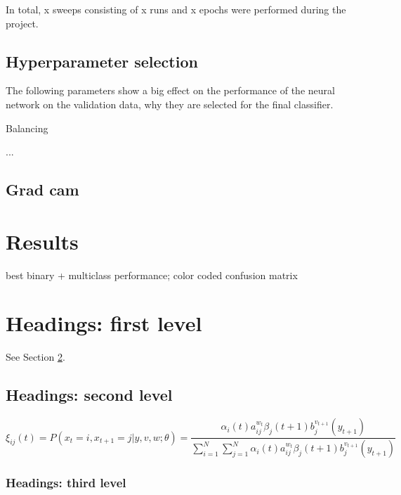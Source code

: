\documentclass{article}
\begin{document}
In total, x sweeps consisting of x runs and x epochs were performed during the project.

\subsection{Hyperparameter selection}
The following parameters show a big effect on the performance of the neural network on the validation data, 
why they are selected for the final classifier.

Balancing

...

\subsection{Grad cam}
\section{Results}
best binary + multiclass performance;
color coded confusion matrix

\section{Headings: first level}
\label{sec:headings}

\lipsum[4] See Section \ref{sec:headings}.

\subsection{Headings: second level}
\lipsum[5]
\begin{equation}
\xi _{ij}(t)=P(x_{t}=i,x_{t+1}=j|y,v,w;\theta)= {\frac {\alpha _{i}(t)a^{w_t}_{ij}\beta _{j}(t+1)b^{v_{t+1}}_{j}(y_{t+1})}{\sum _{i=1}^{N} \sum _{j=1}^{N} \alpha _{i}(t)a^{w_t}_{ij}\beta _{j}(t+1)b^{v_{t+1}}_{j}(y_{t+1})}}
\end{equation}

\subsubsection{Headings: third level}
\lipsum[6]
\end{document}

